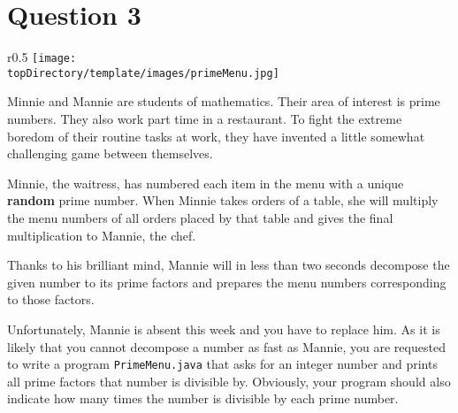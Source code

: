 \section*{Question 3}

\begin{wrapfigure}{r}{0.5\textwidth}
\centering
\texttt{[image: \\topDirectory/template/images/primeMenu.jpg]}
\end{wrapfigure}

Minnie and Mannie are students of mathematics. Their area of interest is prime numbers. They also work part time in a restaurant. To fight the extreme boredom of their routine tasks at work, they have invented a little somewhat challenging game between themselves.

Minnie, the waitress, has numbered each item in the menu with a unique \textbf{random} prime number. When Minnie takes orders of a table, she will multiply the menu numbers of all orders placed by that table and gives the final multiplication to Mannie, the chef.

Thanks to his brilliant mind, Mannie will in less than two seconds decompose the given number to its prime factors and prepares the menu numbers corresponding to those factors.

Unfortunately, Mannie is absent this week and you have to replace him. As it is likely that you cannot decompose a number as fast as Mannie, you are requested to write a program \texttt{PrimeMenu.java} that asks for an integer number and prints all prime factors that number is divisible by. Obviously, your program should also indicate how many times the number is divisible by each prime number.
\newpage
